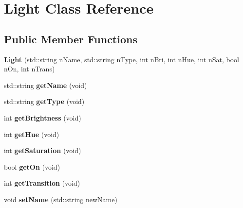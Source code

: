 \hypertarget{classLight}{}\section{Light Class Reference}
\label{classLight}
\subsection*{Public Member Functions}
\begin{DoxyCompactItemize}
\item 
{\bfseries Light} (std\+::string n\+Name, std\+::string n\+Type, int n\+Bri, int n\+Hue, int n\+Sat, bool n\+On, int n\+Trans)\hypertarget{classLight_aaeb13d35d2c08e223ca32e8382e83452}{}\label{classLight_aaeb13d35d2c08e223ca32e8382e83452}

\item 
std\+::string {\bfseries get\+Name} (void)\hypertarget{classLight_a768a0219abfdc1684e90513995280b08}{}\label{classLight_a768a0219abfdc1684e90513995280b08}

\item 
std\+::string {\bfseries get\+Type} (void)\hypertarget{classLight_a8dfd61470ed66935ef3ea2de76d7049a}{}\label{classLight_a8dfd61470ed66935ef3ea2de76d7049a}

\item 
int {\bfseries get\+Brightness} (void)\hypertarget{classLight_ad512a50c53993d50ef98731d7b1d6653}{}\label{classLight_ad512a50c53993d50ef98731d7b1d6653}

\item 
int {\bfseries get\+Hue} (void)\hypertarget{classLight_abc39a64bfcc5b43088cefcd662956cb8}{}\label{classLight_abc39a64bfcc5b43088cefcd662956cb8}

\item 
int {\bfseries get\+Saturation} (void)\hypertarget{classLight_ab654f1c6ffbc3f79fc88d487449dd744}{}\label{classLight_ab654f1c6ffbc3f79fc88d487449dd744}

\item 
bool {\bfseries get\+On} (void)\hypertarget{classLight_a4145a367202562504ccf4314f489d0eb}{}\label{classLight_a4145a367202562504ccf4314f489d0eb}

\item 
int {\bfseries get\+Transition} (void)\hypertarget{classLight_ab38069befb7f7ba10b8ee0cffaf89d57}{}\label{classLight_ab38069befb7f7ba10b8ee0cffaf89d57}

\item 
void {\bfseries set\+Name} (std\+::string new\+Name)\hypertarget{classLight_acbb28a74fceea5fc98568b315e328eac}{}\label{classLight_acbb28a74fceea5fc98568b315e328eac}


\end{DoxyCompactItemize}
